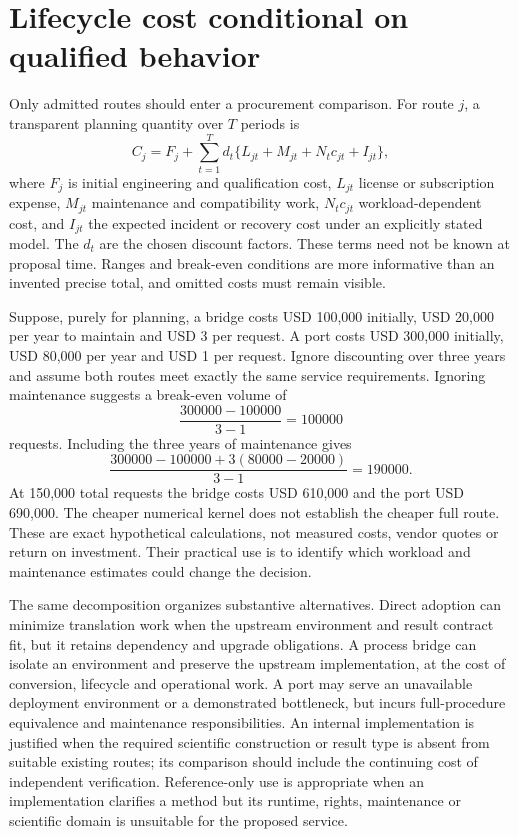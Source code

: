 \section{Lifecycle cost conditional on qualified behavior}

Only admitted routes should enter a procurement comparison. For route \(j\),
a transparent planning quantity over \(T\) periods is
\[
 C_j=F_j+\sum_{t=1}^{T}d_t
  \{L_{jt}+M_{jt}+N_t c_{jt}+I_{jt}\},
\]
where \(F_j\) is initial engineering and qualification cost, \(L_{jt}\)
license or subscription expense, \(M_{jt}\) maintenance and compatibility
work, \(N_t c_{jt}\) workload-dependent cost, and \(I_{jt}\) the expected
incident or recovery cost under an explicitly stated model. The \(d_t\)
are the chosen discount factors. These terms need not be known at proposal
time. Ranges and break-even conditions are more informative than an invented
precise total, and omitted costs must remain visible.

Suppose, purely for planning, a bridge costs USD 100,000 initially, USD 20,000
per year to maintain and USD 3 per request. A port costs USD 300,000 initially,
USD 80,000 per year and USD 1 per request. Ignore discounting over three years
and assume both routes meet exactly the same service requirements. Ignoring
maintenance suggests a break-even volume of
\[
 \frac{300000-100000}{3-1}=100000
\]
requests. Including the three years of maintenance gives
\[
 \frac{300000-100000+3(80000-20000)}{3-1}=190000.
\]
At 150,000 total requests the bridge costs USD 610,000 and the port USD
690,000. The cheaper numerical kernel does not establish the cheaper full
route. These are exact hypothetical calculations, not measured costs, vendor
quotes or return on investment. Their practical use is to identify which
workload and maintenance estimates could change the decision.
\citep{exec16_s10_exact}

The same decomposition organizes substantive alternatives. Direct adoption
can minimize translation work when the upstream environment and result contract
fit, but it retains dependency and upgrade obligations. A process bridge can
isolate an environment and preserve the upstream implementation, at the cost
of conversion, lifecycle and operational work. A port may serve an unavailable
deployment environment or a demonstrated bottleneck, but incurs full-procedure
equivalence and maintenance responsibilities. An internal implementation is
justified when the required scientific construction or result type is absent
from suitable existing routes; its comparison should include the continuing
cost of independent verification. Reference-only use is appropriate when an
implementation clarifies a method but its runtime, rights, maintenance or
scientific domain is unsuitable for the proposed service.

